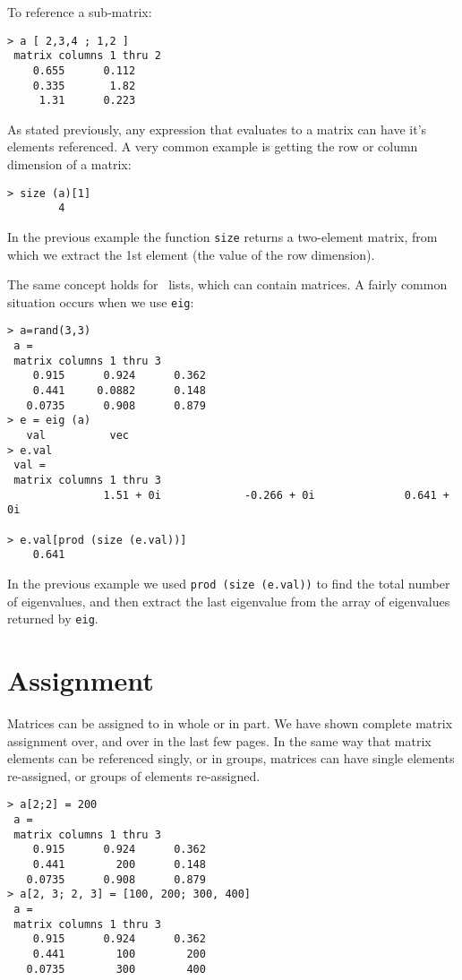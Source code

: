    To reference a sub-matrix:

\begin{verbatim}
> a [ 2,3,4 ; 1,2 ]
 matrix columns 1 thru 2
    0.655      0.112  
    0.335       1.82  
     1.31      0.223  
\end{verbatim}

   As stated previously, any expression that evaluates to a matrix can
   have it's elements referenced. A very common example is getting the
   row or column dimension of a matrix:

\begin{verbatim}
> size (a)[1]
        4
\end{verbatim}

   In the previous example the function \verb+size+ returns a
   two-element matrix, from which we extract the 1st element (the
   value of the row dimension).

   The same concept holds for \RLaB\ lists, which can contain matrices.
   A fairly common situation occurs when we use \verb+eig+:

\begin{verbatim}
> a=rand(3,3)
 a =
 matrix columns 1 thru 3
    0.915      0.924      0.362  
    0.441     0.0882      0.148  
   0.0735      0.908      0.879  
> e = eig (a)
   val          vec          
> e.val
 val =
 matrix columns 1 thru 3
               1.51 + 0i             -0.266 + 0i              0.641 + 0i

> e.val[prod (size (e.val))]
    0.641
\end{verbatim}

   In the previous example we used \verb+prod (size (e.val))+ to find
   the total number of eigenvalues, and then extract the last
   eigenvalue from the array of eigenvalues returned by \verb+eig+.

\section{Assignment}

   Matrices can be assigned to in whole or in part. We have shown
   complete matrix assignment over, and over in the last few pages. In
   the same way that matrix elements can be referenced singly, or in
   groups, matrices can have single elements re-assigned, or groups of
   elements re-assigned.

\begin{verbatim}
> a[2;2] = 200
 a =
 matrix columns 1 thru 3
    0.915      0.924      0.362  
    0.441        200      0.148  
   0.0735      0.908      0.879  
> a[2, 3; 2, 3] = [100, 200; 300, 400]
 a =
 matrix columns 1 thru 3
    0.915      0.924      0.362  
    0.441        100        200  
   0.0735        300        400  
\end{verbatim}

